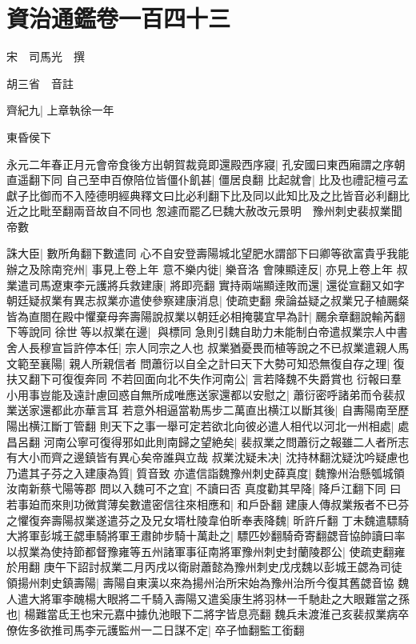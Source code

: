 \chapter{資治通鑑卷一百四十三}
宋　司馬光　撰

胡三省　音註

齊紀九|{
	上章執徐一年}


東昏侯下

永元二年春正月元會帝食後方出朝賀裁竟即還殿西序寢|{
	孔安國曰東西廂謂之序朝直遥翻下同}
自己至申百僚陪位皆僵仆飢甚|{
	僵居良翻}
比起就會|{
	比及也禮記檀弓孟獻子比御而不入陸德明經典釋文曰比必利翻下比及同以此知比及之比皆音必利翻比近之比毗至翻兩音故自不同也}
怱遽而罷乙巳魏大赦改元景明　豫州刺史裴叔業聞帝數

誅大臣|{
	數所角翻下數遣同}
心不自安登壽陽城北望肥水謂部下曰卿等欲富貴乎我能辦之及除南兖州|{
	事見上卷上年}
意不樂内徙|{
	樂音洛}
會陳顯逹反|{
	亦見上卷上年}
叔業遣司馬遼東李元護將兵救建康|{
	將即亮翻}
實持兩端顯逹敗而還|{
	還從宣翻又如字}
朝廷疑叔業有異志叔業亦遣使參察建康消息|{
	使疏吏翻}
衆論益疑之叔業兄子植颺粲皆為直閤在殿中懼棄母奔壽陽說叔業以朝廷必相掩襲宜早為計|{
	颺余章翻說輸芮翻下等說同}
徐世等以叔業在邊|{
	與標同}
急則引魏自助力未能制白帝遣叔業宗人中書舍人長穆宣旨許停本任|{
	宗人同宗之人也}
叔業猶憂畏而植等說之不已叔業遣親人馬文範至襄陽|{
	親人所親信者}
問蕭衍以自全之計曰天下大勢可知恐無復自存之理|{
	復扶又翻下可復復奔同}
不若回面向北不失作河南公|{
	言若降魏不失爵賞也}
衍報曰羣小用事豈能及遠計慮回惑自無所成唯應送家還都以安慰之|{
	蕭衍密呼諸弟而令裴叔業送家還都此亦華言耳}
若意外相逼當勒馬步二萬直出横江以斷其後|{
	自夀陽南至歷陽出横江斷丁管翻}
則天下之事一舉可定若欲北向彼必遣人相代以河北一州相處|{
	處昌呂翻}
河南公寧可復得邪如此則南歸之望絶矣|{
	裴叔業之問蕭衍之報雖二人者所志有大小而齊之邊鎮皆有異心矣帝誰與立哉}
叔業沈疑未决|{
	沈持林翻沈疑沈吟疑慮也}
乃遣其子芬之入建康為質|{
	質音致}
亦遣信詣魏豫州刺史薛真度|{
	魏豫州治懸瓠城領汝南新蔡弋陽等郡}
問以入魏可不之宜|{
	不讀曰否}
真度勸其早降|{
	降戶江翻下同}
曰若事廹而來則功微賞薄矣數遣密信往來相應和|{
	和戶卧翻}
建康人傳叔業叛者不已芬之懼復奔壽陽叔業遂遣芬之及兄女壻杜陵韋伯昕奉表降魏|{
	昕許斤翻}
丁未魏遣驃騎大將軍彭城王勰車騎將軍王肅帥步騎十萬赴之|{
	驃匹妙翻騎奇寄翻勰音協帥讀曰率}
以叔業為使持節都督豫雍等五州諸軍事征南將軍豫州刺史封蘭陵郡公|{
	使疏吏翻雍於用翻}
庚午下詔討叔業二月丙戌以衛尉蕭懿為豫州刺史戊戌魏以彭城王勰為司徒領揚州刺史鎮壽陽|{
	壽陽自東漢以來為揚州治所宋始為豫州治所今復其舊勰音協}
魏人遣大將軍李醜楊大眼將二千騎入壽陽又遣奚康生將羽林一千馳赴之大眼難當之孫也|{
	楊難當氐王也宋元嘉中據仇池眼下二將字皆息亮翻}
魏兵未渡淮己亥裴叔業病卒僚佐多欲推司馬李元護監州一二日謀不定|{
	卒子恤翻監工銜翻}
